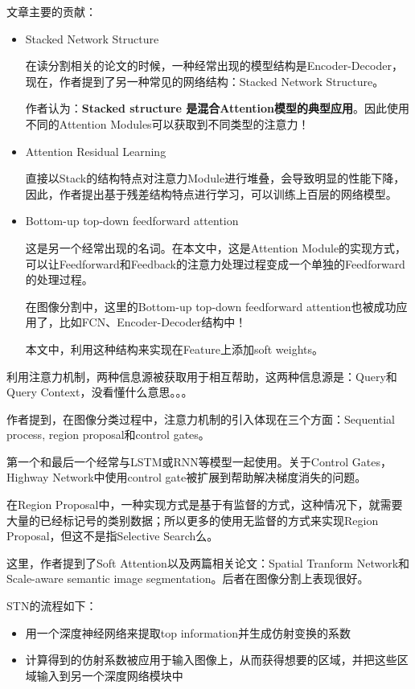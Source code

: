 文章主要的贡献：
\begin{itemize}
\item Stacked Network Structure

在读分割相关的论文的时候，一种经常出现的模型结构是Encoder-Decoder，现在，作者提到了另一种常见的网络结构：Stacked Network Structure。

作者认为：{\bfseries Stacked structure 是混合Attention模型的典型应用}。因此使用不同的Attention Modules可以获取到不同类型的注意力！

\item Attention Residual Learning

直接以Stack的结构特点对注意力Module进行堆叠，会导致明显的性能下降，因此，作者提出基于残差结构特点进行学习，可以训练上百层的网络模型。

\item Bottom-up top-down feedforward attention

这是另一个经常出现的名词。在本文中，这是Attention Module的实现方式，可以让Feedforward和Feedback的注意力处理过程变成一个单独的Feedforward的处理过程。

在图像分割中，这里的Bottom-up top-down feedforward attention也被成功应用了，比如FCN、Encoder-Decoder结构中！

本文中，利用这种结构来实现在Feature上添加soft weights。

\end{itemize}

利用注意力机制，两种信息源被获取用于相互帮助，这两种信息源是：Query和Query Context，没看懂什么意思。。。

作者提到，在图像分类过程中，注意力机制的引入体现在三个方面：Sequential process, region proposal和control gates。

第一个和最后一个经常与LSTM或RNN等模型一起使用。关于Control Gates，Highway Network中使用control gate被扩展到帮助解决梯度消失的问题。

在Region Proposal中，一种实现方式是基于有监督的方式，这种情况下，就需要大量的已经标记号的类别数据；所以更多的使用无监督的方式来实现Region Proposal，但这不是指Selective Search么。

这里，作者提到了Soft Attention以及两篇相关论文：Spatial Tranform Network和Scale-aware semantic image segmentation。后者在图像分割上表现很好。

STN的流程如下：
\begin{itemize}
\item 用一个深度神经网络来提取top information并生成仿射变换的系数
\item 计算得到的仿射系数被应用于输入图像上，从而获得想要的区域，并把这些区域输入到另一个深度网络模块中
\end{itemize}

